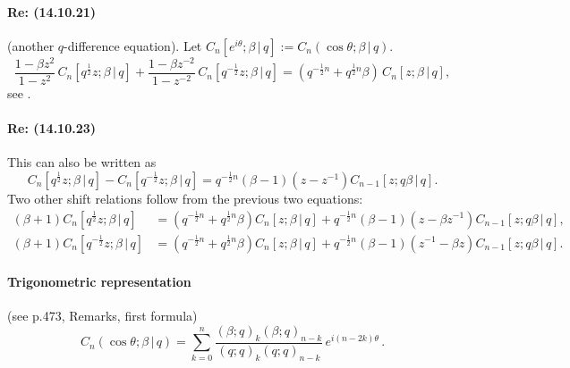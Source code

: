 \documentclass[twoside,11pt]{article}
\newcommand\be\beta
\newcommand\tha\theta
\newcommand\half{\frac12}
\begin{document}
\paragraph{Re: (14.10.21)}
(another $q$-difference equation).
Let $C_n[e^{i\tha};\be\,|\, q]:=C_n(\cos\tha;\be\,|\, q)$.
\begin{equation}
\frac{1-\be z^2}{1-z^2}\,C_n[q^\half z;\be\,|\, q]+
\frac{1-\be z^{-2}}{1-z^{-2}}\,C_n[q^{-\half}z;\be\,|\, q]=
(q^{-\half n}+q^{\half n} \be)\,C_n[z;\be\,|\, q],
\label{24}
\end{equation}
see .
%
\paragraph{Re: (14.10.23)}
This can also be written as
\begin{equation}
C_n[q^\half z;\be\,|\, q]-C_n[q^{-\half}z;\be\,|\, q]=
q^{-\half n}(\be-1)(z-z^{-1})C_{n-1}[z;q\be\,|\, q].
\label{25}
\end{equation}
Two other shift relations follow from the previous two equations:
\begin{align}
(\be+1)C_n[q^\half z;\be\,|\, q]&=(q^{-\half n}+q^{\half n}\be)C_n[z;\be\,|\, q]
+q^{-\half n}(\be-1)(z-\be z^{-1})C_{n-1}[z;q\be\,|\, q],
\label{26}\\
(\be+1)C_n[q^{-\half}z;\be\,|\, q]&=(q^{-\half n}+q^{\half n}\be)C_n[z;\be\,|\, q]
+q^{-\half n}(\be-1)(z^{-1}-\be z)C_{n-1}[z;q\be\,|\, q].
\label{27}
\end{align}
%
\paragraph{Trigonometric representation}
(see p.473, Remarks, first formula)
\begin{equation}
C_n(\cos\tha;\be\,|\, q)=\sum_{k=0}^n
\frac{(\be;q)_k (\be;q)_{n-k}}{(q;q)_k (q;q)_{n-k}}\,e^{i(n-2k)\tha}\,.
\label{173}
\end{equation}
%
\end{document}
